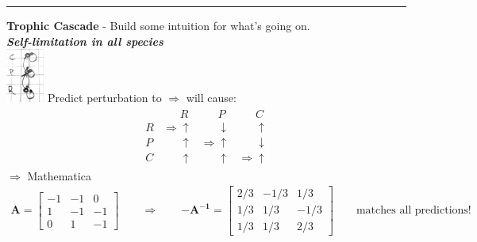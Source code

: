 \documentclass{article}
\newcommand{\note}[1]{\colorbox{gray!30}{#1}}
\newcommand{\ind}{\-\hspace{1cm}}
\begin{document}
\rule[0.5ex]{\linewidth}{1pt}
\textbf{Trophic Cascade} -  Build some intuition for what's going on.\\
\emph{\textbf{Self-limitation in all species}}\\
\includegraphics[width=1.25cm]{figs/TC_full.pdf}
\ind Predict perturbation to $\Rightarrow$ will cause:
\begin{align*}
\begin{matrix}
	 &	\phantom{\Rightarrow} R & \phantom{\Rightarrow}P & \phantom{\Rightarrow}C\\
	R &	\Rightarrow \uparrow & \phantom{\Rightarrow}\downarrow & \phantom{\Rightarrow} \uparrow\\
	P & \phantom{\Rightarrow}\uparrow & \Rightarrow \uparrow & \phantom{\Rightarrow}\downarrow\\
	C & \phantom{\Rightarrow} \uparrow & \phantom{\Rightarrow} \uparrow & \Rightarrow \uparrow
\end{matrix}
\end{align*}
 \note{$\Rightarrow$ Mathematica}
\begin{align*}
	\mathbf{A}=\begin{bmatrix} -1 & -1 & 0 \\ 1 & -1 & -1 \\ 0 & 1 & -1 \end{bmatrix} \qquad \Rightarrow \qquad \mathbf{-A^{-1}}=\begin{bmatrix} 2/3 & -1/3 & 1/3 \\ 1/3 & 1/3 & -1/3 \\ 1/3 & 1/3 & 2/3 \end{bmatrix} \qquad \text{matches all predictions!}
\end{align*}
\end{document}

